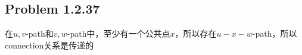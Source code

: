 \subsection*{Problem 1.2.37}
在$u,v$-path和$v,w$-path中，至少有一个公共点$x$，所以存在$u-x-w$-path，所以connection关系是传递的

